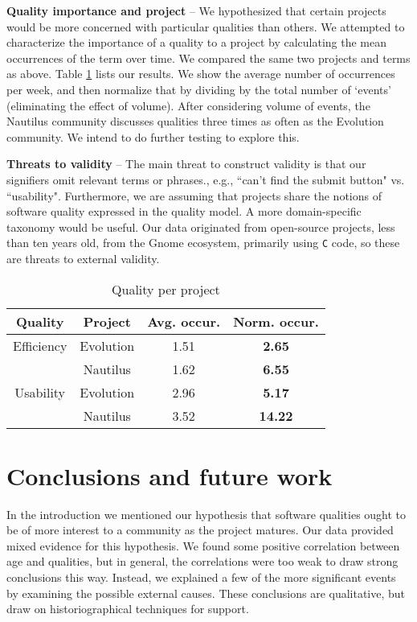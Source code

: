 \documentclass[conference, compsoc]{IEEEtran}
\begin{document}
\noindent\textbf{Quality importance and project} -- We hypothesized that certain projects would be more concerned with particular qualities than others. We attempted to characterize the importance of a quality to a project by calculating the mean occurrences of the term over time. We compared the same two projects and terms as above. Table \ref{tbl:quality-project} lists our results. We show the average number of occurrences per week, and then normalize that by dividing by the total number of `events' (eliminating the effect of volume). After considering volume of events, the Nautilus community discusses qualities three times as often as the Evolution community. We intend to do further testing to explore this.

\noindent\textbf{Threats to validity} -- The main threat to construct validity is that our signifiers omit relevant terms or phrases., e.g., ``can't find the submit button" vs. ``usability". Furthermore, we are assuming that projects share the notions of software quality expressed in the quality model. A more domain-specific taxonomy would be useful. Our data originated from open-source projects, less than ten years old, from the Gnome ecosystem, primarily using \texttt{C} code, so these are threats to external validity.

\begin{table}
	\caption{Quality per project}
	\centering
	\label{tbl:quality-project}
\begin{tabular}{|c|c|c|c|}
\hline
\rowcolor[gray]{.9} 
	Quality & Project & Avg. occur. & Norm. occur.\\ \hline
Efficiency & Evolution & 1.51 & \textbf{2.65}\\
 & Nautilus & 1.62 &\textbf{ 6.55}\\\hline
Usability & Evolution & 2.96 & \textbf{5.17}\\
 & Nautilus & 3.52 & \textbf{14.22}\\
\hline
\end{tabular}
\end{table}

\vspace{-2mm}
\section{Conclusions and future work}
\vspace{-2mm}
In the introduction we mentioned our hypothesis that software qualities ought to be of more interest to a community as the project matures. Our data provided mixed evidence for this hypothesis. We found some positive correlation between age and qualities, but in general, the correlations were too weak to draw strong conclusions this way. Instead, we explained a few of the more significant events by examining the possible external causes. These conclusions are qualitative, but draw on historiographical techniques for support.
\end{document}

